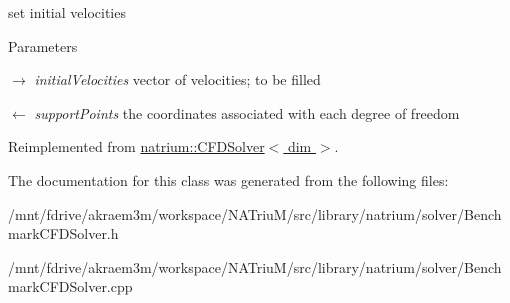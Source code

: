 set initial velocities 
\begin{DoxyParams}{Parameters}
\item[\mbox{$\rightarrow$} {\em initialVelocities}]vector of velocities; to be filled \item[\mbox{$\leftarrow$} {\em supportPoints}]the coordinates associated with each degree of freedom \end{DoxyParams}


Reimplemented from \hyperlink{classnatrium_1_1CFDSolver_afd82bfa5e1e613ef99b9b870cb73db0e}{natrium::CFDSolver$<$ dim $>$}.

The documentation for this class was generated from the following files:\begin{DoxyCompactItemize}
\item 
/mnt/fdrive/akraem3m/workspace/NATriuM/src/library/natrium/solver/BenchmarkCFDSolver.h\item 
/mnt/fdrive/akraem3m/workspace/NATriuM/src/library/natrium/solver/BenchmarkCFDSolver.cpp\end{DoxyCompactItemize}
